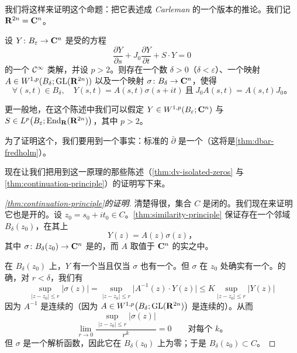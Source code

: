 我们将这样来证明这个命题：把它表述成 \emph{Carleman\trSimilarityPrinciple} 的一个版本的推论。我们记 $\mathbf{R}^{2n}=\mathbf{C}^n$。

\begin{lemma}[\trSimilarityPrinciple]\label{thm:similarity-principle}
设 $Y\colon B_\varepsilon\to\mathbf{C}^n$ 是受\trPerturbation{}的\trCauchyRiemann{}方程
\[
\frac{\partial Y}{\partial s}+J_0\frac{\partial Y}{\partial t}+S\cdot Y=0
\]
的一个 $\mathcal{C}^\infty$ 类解，并设 $p>2$。则存在一个数 $\delta>0$（$\delta<\varepsilon$）、一个映射 $A\in W^{1,p}(B_\delta;\mathrm{GL}(\mathbf{R}^{2n}))$ 以及一个\trHolomorphic{}映射 $\sigma\colon B_\delta\to\mathbf{C}^n$，使得
\[
\forall(s,t)\in B_\delta,\quad
Y(s,t)=A(s,t)\sigma(s+it)
\ \text{且}\
J_0A(s,t)=A(s,t)J_0\text{。}
\]
\end{lemma}

\begin{remark}\label{thm:similarity-principle-integrable}
更一般地，在这个陈述中我们可以假定 $Y\in W^{1,p}(B_\varepsilon;\mathbf{C}^n)$ 与 $S\in L^p\bigl(B_\varepsilon;\operatorname{End}_{\mathbf{R}}(\mathbf{R}^{2n})\bigr)$，其中 $p>2$。
\end{remark}

为了证明这个\trSimilarityPrinciple，我们要用到一个事实：标准的 $\bar{\partial}$ 是一个\trFredholmOperator（这将是\cref{thm:dbar-fredholm}）。

现在让我们把用到这一原理的那些陈述（\cref{thm:dv-isolated-zeros} 与 \cref{thm:continuation-principle}）的证明写下来。

\begin{proof}[\cref{thm:continuation-principle}的证明]
清楚得很，集合 $C$ 是闭的。我们现在来证明它也是开的。设 $z_0=s_0+it_0\in C$。\cref{thm:similarity-principle} 保证存在一个邻域 $B_\delta(z_0)$，在其上
\[
Y(z)=A(z)\sigma(z)\text{，}
\]
其中 $\sigma\colon B_\delta(z_0)\to\mathbf{C}^n$ 是\trHolomorphic{}的，而 $A$ 取值于 $\mathbf{C}^n$ 的实\trEndomorphism{}之中。

在 $B_\delta(z_0)$ 上，$Y$ 有一个\trInfiniteOrderZero{}当且仅当 $\sigma$ 也有一个。但 $\sigma$ 在 $z_0$ 处确实有一个\trInfiniteOrderZero。的确，对 $r<\delta$，我们有
\[
\sup_{|z-z_0|\le r}|\sigma(z)|
=\sup_{|z-z_0|\le r}\bigl|A^{-1}(z)\cdot Y(z)\bigr|
\le K\sup_{|z-z_0|\le r}|Y(z)|
\]
因为 $A^{-1}$ 是连续的（因为 $A\in W^{1,p}\bigl(B_\delta;\mathrm{GL}(\mathbf{R}^{2n})\bigr)$ 是连续的）。从而
\[
\lim_{r\to0}\frac{\sup_{|z-z_0|\le r}|\sigma(z)|}{r^k}=0
\qquad\text{对每个 }k\text{。}
\]
但 $\sigma$ 是一个解析函数，因此它在 $B_\delta(z_0)$ 上为零；于是 $B_\delta(z_0)\subset C$。
\end{proof}

